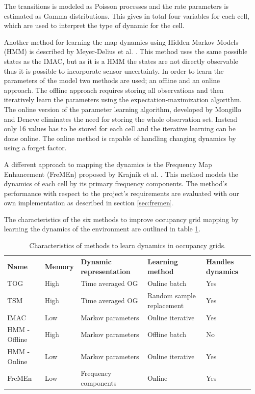 The transitions is modeled as Poisson processes and the rate parameters is estimated as Gamma distributions. This gives in total four variables for each cell, which are used to interpret the type of dynamic for the cell. 

Another method for learning the map dynamics using Hidden Markov Models (HMM) is described by Meyer-Delius et al. \cite{Meyer-Delius2012}. This method uses the same possible states as the IMAC, but as it is a HMM the states are not directly observable thus it is possible to incorporate sensor uncertainty. In order to learn the parameters of the model two methods are used; an offline and an online approach. The offline approach requires storing all observations and then iteratively learn the parameters using the expectation-maximization algorithm. The online version of the parameter learning algorithm, developed by Mongillo and Deneve \cite{Mongillo2008} eliminates the need for storing the whole observation set. Instead only 16 values has to be stored for each cell and the iterative learning can be done online. The online method is capable of handling changing dynamics by using a forget factor. 

A different approach to mapping the dynamics is the Frequency Map Enhancement (FreMEn) proposed by Krajník et al. \cite{Krajnik2014}. This method models the dynamics of each cell by its primary frequency components. 
The method's performance with respect to the project's requirements are evaluated with our own implementation as described in section \ref{sec:fremen}.

The characteristics of the six methods to improve occupancy grid mapping by learning the dynamics of the environment are outlined in table \ref{tab:learners_characteristics}.

\begin{table}[htbp]
    \centering
    \caption{Characteristics of methods to learn dynamics in occupancy grids.}
    \label{tab:learners_characteristics}
    \begin{tabular}{p{2.6cm} | p{1.6cm} | p{} | p{2.6cm} | p{1.6cm}}
        \toprule
        \textbf{Name} & \textbf{Memory} & \textbf{Dynamic representation} & \textbf{Learning method} & \textbf{Handles dynamics} \\
        \rowcolor[gray]{0.925}
        TOG & High & Time averaged OG & Online batch & Yes \\
        TSM & High & Time  averaged OG & Random sample replacement  & Yes\\
        \rowcolor[gray]{0.925}
        IMAC & Low & Markov parameters & Online iterative & Yes \\
        HMM - Offline & High & Markov parameters & Offline batch  & No \\
        \rowcolor[gray]{0.925} 
        HMM - Online & Low & Markov parameters & Online iterative & Yes \\
        FreMEn & Low & Frequency components & Online & Yes\\
        \bottomrule
    \end{tabular}
\end{table}

